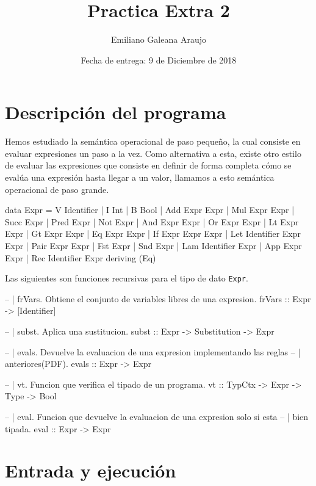 \documentclass[spanish,12pt,letterpaper]{article}
\title{Practica Extra 2}
\author{Emiliano Galeana Araujo}
\affil{Facultad de Ciencias, UNAM}
\date{Fecha de entrega: 9 de Diciembre de 2018}
\begin{document}
\maketitle

\section{Descripción del programa}
Hemos estudiado la semántica operacional de paso pequeño, la cual consiste en
evaluar expresiones un paso a la vez. Como alternativa a esta, existe otro
estilo de evaluar las expresiones que consiste en definir de forma completa cómo
se evalúa una expresión hasta llegar a un valor, llamamos a esto semántica
operacional de paso grande.

\begin{code}
  data Expr = V Identifier | I Int | B Bool
          | Add Expr Expr | Mul Expr Expr | Succ Expr | Pred Expr
          | Not Expr | And Expr Expr | Or Expr Expr
          | Lt Expr Expr | Gt Expr Expr | Eq Expr Expr
          | If Expr Expr Expr
          | Let Identifier Expr Expr
          | Pair Expr Expr
          | Fst Expr | Snd Expr
          | Lam Identifier Expr
          | App Expr Expr
          | Rec Identifier Expr deriving (Eq)
\end{code}

Las siguientes son funciones recursivas para el tipo de dato \texttt{Expr}.

\begin{code}
   -- | frVars. Obtiene el conjunto de variables libres de una expresion.
   frVars :: Expr -> [Identifier]

   -- | subst. Aplica una sustitucion.
   subst :: Expr -> Substitution -> Expr

   -- | evals. Devuelve la evaluacion de una expresion implementando las reglas
   -- |        anteriores(PDF).
   evals :: Expr -> Expr

   -- | vt. Funcion que verifica el tipado de un programa.
   vt :: TypCtx -> Expr -> Type -> Bool

   -- | eval. Funcion que devuelve la evaluacion de una expresion solo si esta
   -- |       bien tipada.
   eval :: Expr -> Expr

\end{code}

\section{Entrada y ejecución}
\end{document}
